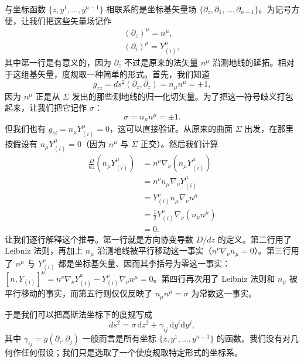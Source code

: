 与坐标函数 $\{z, y^1, \ldots, y^{n-1}\}$ 相联系的是坐标基矢量场 $\{\partial_z, \partial_1, \ldots, \partial_{n-1}\}$。为记号方便，让我们把这些矢量场记作
\begin{gather*}
(\partial_z)^\mu = n^\mu, \\
(\partial_i)^\mu = Y^\mu_{(i)},
\tag{D.16}
\end{gather*}
其中第一行是有意义的，因为 $\partial_z$ 不过是原来的法矢量 $n^\mu$ 沿测地线的延拓。相对于这组基矢量，度规取一种简单的形式。首先，我们知道
\begin{equation*}
g_{zz} = ds^2 (\partial_z, \partial_z) = n_\mu n^\mu = \pm 1,
\tag{D.17}
\end{equation*}
因为 $n^\mu$ 正是从 $\Sigma$ 发出的那些测地线的归一化切矢量。为了把这一符号歧义打包起来，让我们把它记作 $\sigma$：
\begin{equation*}
\sigma = n_\mu n^\mu = \pm 1.
\tag{D.18}
\end{equation*}
但我们也有 $g_{zi} = n_\mu Y^\mu_{(i)} = 0$，这可以直接验证。从原来的曲面 $\Sigma$ 出发，在那里按假设有 $n_\mu Y^\mu_{(i)} = 0$（因为 $n^\mu$ 与 $\Sigma$ 正交）。然后我们计算
\begin{align*}
\frac{D}{dz} \left( n_\mu Y^\mu_{(i)} \right) &= n^\nu \nabla_\nu \left( n_\mu Y^\mu_{(i)} \right) \\
&= n^\nu n_\mu \nabla_\nu Y^\mu_{(i)} \\
&= Y^\nu_{(i)} n_\mu \nabla_\nu n^\mu \\
&= \frac{1}{2} Y^\nu_{(i)} \nabla_\nu \left( n_\mu n^\mu \right) \\
&= 0.
\tag{D.19}
\end{align*}
让我们逐行解释这个推导。第一行就是方向协变导数 $D/dz$ 的定义。第二行用了 Leibniz 法则，再加上 $n_\mu$ 沿测地线被平行移动这一事实（$n^\nu \nabla_\nu n_\mu = 0$）。第三行用了 $n^\mu$ 与 $Y^\nu_{(i)}$ 都是坐标基矢量、因而其李括号为零这一事实：$[n, Y_{(i)}]^\mu = n^\nu \nabla_\nu Y^\mu_{(i)} - Y^\nu_{(i)} \nabla_\nu n^\mu = 0$。第四行再次用了 Leibniz 法则和 $n_\mu$ 被平行移动的事实，而第五行则仅仅反映了 $n_\mu n^\mu = \sigma$ 为常数这一事实。

于是我们可以把高斯法坐标下的度规写成
\begin{equation*}
\boxed{\, ds^2 = \sigma \, \mathrm{d}z^2 + \gamma_{ij} \, \mathrm{d}y^i \mathrm{d}y^j, \,}
\tag{D.20}
\end{equation*}
其中 $\gamma_{ij} = g(\partial_i, \partial_j)$ 一般而言是所有坐标 $\{z, y^1, \ldots, y^{n-1}\}$ 的函数。我们没有对几何作任何假设；我们只是选取了一个使度规取特定形式的坐标系。

